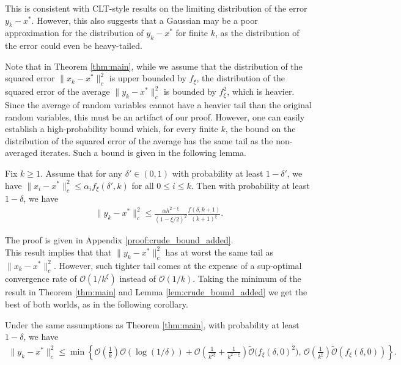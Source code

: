 \documentclass[letterpaper, 10 pt]{article}
\begin{document}
This is consistent with CLT-style results on the limiting distribution of the error $y_k-x^*$. However, this also suggests that a Gaussian may be a poor approximation for the distribution of $y_k-x^*$ for finite $k$, as the distribution of the error could even be heavy-tailed.

Note that in Theorem \ref{thm:main}, while we assume that the distribution of the squared error $\|x_k-x^*\|_c^2$ is upper bounded by $f_\xi$, the distribution of the squared error of the average $\|y_k-x^*\|_c^2$ is bounded by $f_\xi^2$, which is heavier. Since the average of random variables cannot have a heavier tail than the original random variables, this must be an artifact of our proof. However, one can easily establish a high-probability bound which, for every finite $k$, the bound on the distribution of the squared error of the average has the same tail as the non-averaged iterates. Such a bound is given in the following lemma.

\begin{lemma}\label{lem:crude_bound_added}
    Fix $k\geq 1$. Assume that for any $\delta'\in (0,1)$ with probability at least $1-\delta'$, we have $\|x_i-x^*\|^2_c \leq \alpha_i f_\xi(\delta',k)$ for all $0\leq i\leq k$. Then with probability at least $1-\delta$, we have
    \begin{align}
    \|y_k-x^*\|_c^2\leq \frac{\alpha h^{2-\xi} }{(1-\xi/2)^2}\frac{f(\delta,k+1)}{(k+1)^{\xi}}.\nonumber
\end{align}
\end{lemma}
The proof is given in Appendix \ref{proof:crude_bound_added}.\\

This result implies that that $\|y_k-x^*\|_c^2$ has at worst the same tail as $\|x_k-x^*\|_c^2$. However, such tighter tail comes at the expense of a sup-optimal convergence rate of $\mathcal{O}(1/k^\xi)$ instead of $\mathcal{O}(1/k)$. Taking the minimum of the result in Theorem \ref{thm:main} and Lemma \ref{lem:crude_bound_added} we get the best of both worlds, as in the following corollary.

\begin{corollary}\label{cor:1}
Under the same assumptions as Theorem \ref{thm:main}, with probability at least $1-\delta$, we have
\begin{align*}
\|y_k - x^*\|_c^2 \leq \min\left\{\mathcal{O}\left(\frac{1}{k}\right)\mathcal{O}\left(\log(1/\delta)\right) + \mathcal{O}\left(\frac{1}{k^{2\xi}} + \frac{1}{k^{2-\xi}}\right) \tilde{\mathcal{O}}\Big(f_\xi(\delta,0)^2\Big),\,\mathcal{O}\left(\frac{1}{k^\xi}\right)\tilde{\mathcal{O}}(f_\xi(\delta,0))\right\}.
\end{align*}
\end{corollary}
\end{document}
